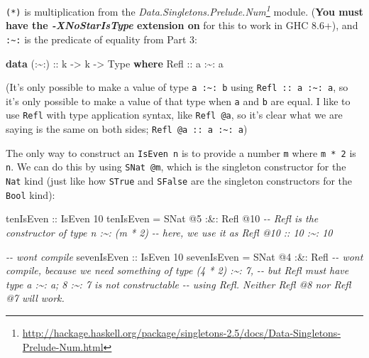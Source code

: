 \documentclass[]{article}
\newenvironment{Shaded}{}{}
\newcommand{\CommentTok}[1]{\textcolor[rgb]{0.38,0.63,0.69}{\textit{#1}}}
\newcommand{\DataTypeTok}[1]{\textcolor[rgb]{0.56,0.13,0.00}{#1}}
\newcommand{\DecValTok}[1]{\textcolor[rgb]{0.25,0.63,0.44}{#1}}
\newcommand{\KeywordTok}[1]{\textcolor[rgb]{0.00,0.44,0.13}{\textbf{#1}}}
\newcommand{\NormalTok}[1]{#1}
\newcommand{\OperatorTok}[1]{\textcolor[rgb]{0.40,0.40,0.40}{#1}}
\newcommand{\OtherTok}[1]{\textcolor[rgb]{0.00,0.44,0.13}{#1}}
\renewcommand{\href}[2]{#2\footnote{\url{#1}}}
\begin{document}
\begin{enumerate}
  \texttt{(*)} is multiplication from the
  \emph{\href{http://hackage.haskell.org/package/singletons-2.5/docs/Data-Singletons-Prelude-Num.html}{Data.Singletons.Prelude.Num}}
  module. (\textbf{You must have the \emph{-XNoStarIsType} extension on} for
  this to work in GHC 8.6+), and \texttt{:\textasciitilde{}:} is the predicate
  of equality from Part 3:

\begin{Shaded}
\begin{Highlighting}[]
\KeywordTok{data}\OtherTok{ (:\textasciitilde{}:) ::}\NormalTok{ k }\OtherTok{{-}\textgreater{}}\NormalTok{ k }\OtherTok{{-}\textgreater{}} \DataTypeTok{Type} \KeywordTok{where}
    \DataTypeTok{Refl}\OtherTok{ ::}\NormalTok{ a }\OperatorTok{:\textasciitilde{}:}\NormalTok{ a}
\end{Highlighting}
\end{Shaded}

  (It's only possible to make a value of type \texttt{a\ :\textasciitilde{}:\ b}
  using \texttt{Refl\ ::\ a\ :\textasciitilde{}:\ a}, so it's only possible to
  make a value of that type when \texttt{a} and \texttt{b} are equal. I like to
  use \texttt{Refl} with type application syntax, like \texttt{Refl\ @a}, so
  it's clear what we are saying is the same on both sides;
  \texttt{Refl\ @a\ ::\ a\ :\textasciitilde{}:\ a})

  The only way to construct an \texttt{IsEven\ n} is to provide a number
  \texttt{m} where \texttt{m\ *\ 2} is \texttt{n}. We can do this by using
  \texttt{SNat\ @m}, which is the singleton constructor for the \texttt{Nat}
  kind (just like how \texttt{STrue} and \texttt{SFalse} are the singleton
  constructors for the \texttt{Bool} kind):

\begin{Shaded}
\begin{Highlighting}[]
\OtherTok{tenIsEven ::} \DataTypeTok{IsEven} \DecValTok{10}
\NormalTok{tenIsEven }\OtherTok{=} \DataTypeTok{SNat} \OperatorTok{@}\DecValTok{5} \OperatorTok{:\&:} \DataTypeTok{Refl} \OperatorTok{@}\DecValTok{10}
    \CommentTok{{-}{-} Refl is the constructor of type n :\textasciitilde{}: (m * 2)}
    \CommentTok{{-}{-} here, we use it as Refl @10 :: 10 :\textasciitilde{}: 10}

\CommentTok{{-}{-} won\textquotesingle{}t compile}
\OtherTok{sevenIsEven ::} \DataTypeTok{IsEven} \DecValTok{10}
\NormalTok{sevenIsEven }\OtherTok{=} \DataTypeTok{SNat} \OperatorTok{@}\DecValTok{4} \OperatorTok{:\&:} \DataTypeTok{Refl}
    \CommentTok{{-}{-} won\textquotesingle{}t compile, because we need something of type \textasciigrave{}(4 * 2) :\textasciitilde{}: 7\textasciigrave{},}
    \CommentTok{{-}{-} but Refl must have type \textasciigrave{}a :\textasciitilde{}: a\textasciigrave{}; \textasciigrave{}8 :\textasciitilde{}: 7\textasciigrave{} is not constructable}
    \CommentTok{{-}{-} using \textasciigrave{}Refl\textasciigrave{}.  Neither \textasciigrave{}Refl @8\textasciigrave{} nor \textasciigrave{}Refl @7\textasciigrave{} will work.}
\end{Highlighting}
\end{Shaded}


\end{enumerate}
\end{document}
